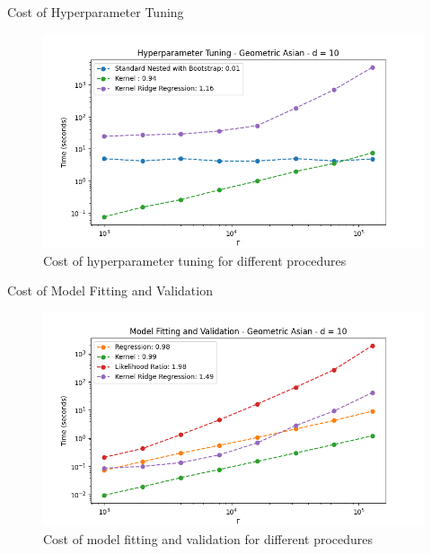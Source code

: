\documentclass[9pt,handout]{beamer}
\begin{document}
\begin{frame}{Cost of Hyperparameter Tuning}

    \begin{figure}
        \includegraphics[width=\textwidth]{../project1/figures/figure12a.png}
        \caption{Cost of hyperparameter tuning for different procedures}
    \end{figure}

\end{frame}

\begin{frame}{Cost of Model Fitting and Validation}

    \begin{figure}
        \includegraphics[width=\textwidth]{../project1/figures/figure12b.png}
        \caption{Cost of model fitting and validation for different procedures}
    \end{figure}

\end{frame}
\end{document}
